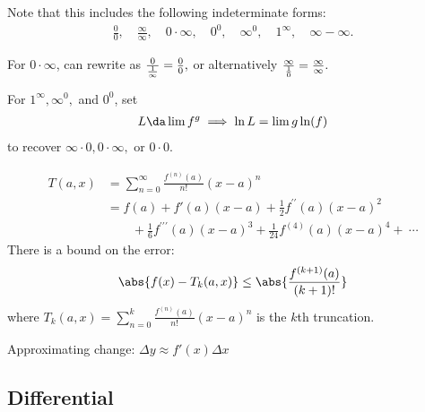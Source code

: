 \begin{remark}

Note that this includes the following indeterminate forms:
\begin{align*}  
\frac{0}{0}, \quad \frac{\infty}{\infty}, \quad 0 \cdot \infty, \quad 0^{0}, \quad \infty^{0}, \quad 1^{\infty}, \quad \infty-\infty
.\end{align*}

For \(0\cdot \infty\), can rewrite as
\({0 \over {1\over \infty}} = {0\over 0},\) or alternatively
\({\infty \over {1\over 0}} = {\infty \over \infty}.\)

For \(1^\infty, \infty^0,\) and \(0^0\), set
\begin{align*}
L \da \lim f^g \implies \ln L = \lim g \ln(f)
\end{align*} to recover \(\infty\cdot 0, 0 \cdot \infty,\) or
\(0\cdot 0\).

\end{remark}

\begin{proposition}

\begin{align*}
T(a, x) &= \sum _ { n = 0 } ^ { \infty } \frac { f ^ { ( n ) } ( a ) } { n ! } ( x - a ) ^ { n }  \\
&= f ( a ) + f'(a)( x - a ) + \frac { 1 } { 2 }f ^ { \prime \prime } ( a ) ( x - a ) ^ { 2 } \\ 
& \quad \quad + \frac { 1} { 6 } f ^ { \prime \prime \prime } ( a ) ( x - a ) ^ { 3 } + \frac{1}{24}f^{(4)}(a)(x-a)^4 + ~\cdots
\end{align*} There is a bound on the error:
\begin{align*}
\abs{f(x) - T_k(a,x)} \leq \abs{\frac{f^{(k+1)}(a)}{(k+1)!}}
\end{align*} where
\(T_k(a, x) = \sum _ { n = 0 } ^ { k } \frac { f ^ { ( n ) } ( a ) } { n ! } ( x - a ) ^ { n }\)
is the \(k\)th truncation.

\end{proposition}

\begin{remark}

Approximating change: \(\Delta y \approx f'(x) \Delta x\)

\end{remark}

\hypertarget{differential}{%
\subsection{Differential}\label{differential}}

